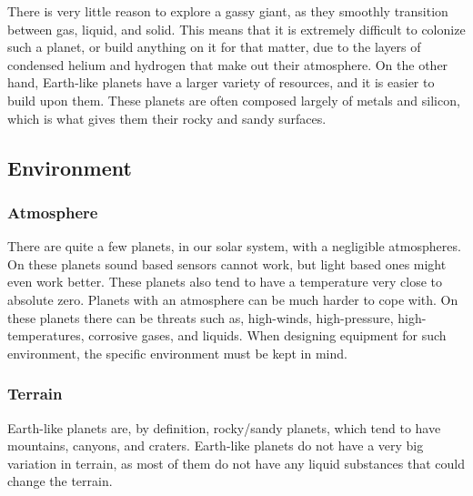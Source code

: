 There is very little reason to explore a gassy giant, as they smoothly transition between gas, liquid, and solid. This means that it is extremely difficult to colonize such a planet, or build anything on it for that matter, due to the layers of condensed helium and hydrogen that make out their atmosphere\cite{outerplanetatmosphere}.
On the other hand, Earth-like planets have a larger variety of resources, and it is easier to build upon them. These planets are often composed largely of metals and silicon, which is what gives them their rocky and sandy surfaces.

\subsection{Environment}
\subsubsection{Atmosphere}
There are quite a few planets, in our solar system, with a negligible atmospheres. On these planets sound based sensors cannot work, but light based ones might even work better. These planets also tend to have a temperature very close to absolute zero\cite{planetstemp}.
Planets with an atmosphere can be much harder to cope with. On these planets there can be threats such as, high-winds, high-pressure, high-temperatures, corrosive gases, and liquids. When designing equipment for such environment, the specific environment must be kept in mind.

\subsubsection{Terrain}
Earth-like planets are, by definition, rocky/sandy planets, which tend to have mountains, canyons, and craters.
Earth-like planets do not have a very big variation in terrain, as most of them do not have any liquid substances that could change the terrain.